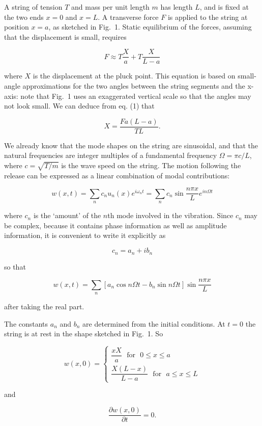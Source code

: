   A string of tension $T$ and mass per unit length $m$ has length $L$, and is 
  fixed at the two ends $x=0$ and $x=L$. A transverse force $F$ is applied to 
  the string at position $x=a$, as sketched in Fig.\ 1. Static equilibrium of 
  the forces, assuming that the displacement is small, requires 

  $$F \approx T \dfrac{X}{a}+ T \dfrac{X}{L-a} \tag{1}$$ 

  where $X$ is the displacement at the pluck point. This equation is based on 
  small-angle approximations for the two angles between the string segments and 
  the x-axis: note that Fig.\ 1 uses an exaggerated vertical scale so that the 
  angles may not look small. We can deduce from eq. (1) that 

  $$X=\dfrac{Fa(L-a)}{TL}. \tag{2}$$ 

  We already know that the mode shapes on the string are sinusoidal, and that 
  the natural frequencies are integer multiples of a fundamental frequency 
  $\Omega = \pi c/L$, where $c=\sqrt{T/m}$ is the wave speed on the string. The 
  motion following the release can be expressed as a linear combination of 
  modal contributions: 

  $$w(x,t)=\sum_n{c_n u_n(x) e^{i \omega_n t}}=\sum_n{c_n \sin \dfrac{n \pi 
  x}{L} e^{in \Omega t}} \tag{3}$$ 

  where $c_n$ is the `amount' of the $n$th mode involved in the vibration. 
  Since $c_n$ may be complex, because it contains phase information as well as 
  amplitude information, it is convenient to write it explicitly as 

  $$c_n=a_n +i b_n \tag{4}$$ 

  so that 

  $$w(x,t)=\sum_n{\left[ a_n \cos n \Omega t -b_n \sin n \Omega t \right] \sin 
  \dfrac{n \pi x}{L}} \tag{5}$$ 

  after taking the real part. 

  The constants $a_n$ and $b_n$ are determined from the initial conditions. At 
  $t=0$ the string is at rest in the shape sketched in Fig.\ 1. So 

  $$w(x,0) = \left\{ \begin{array}{ll} \dfrac{xX}{a} \mathrm{~~~for~~~} 0\le 
  x\le a \\ \dfrac{X(L-x)}{L-a} \mathrm{~~~for~~~} a\le x\le L \end{array} 
  \right. \tag{6}$$ 

  and 

  $$\dfrac{\partial w(x,0)}{\partial t}=0 . \tag{7}$$ 

